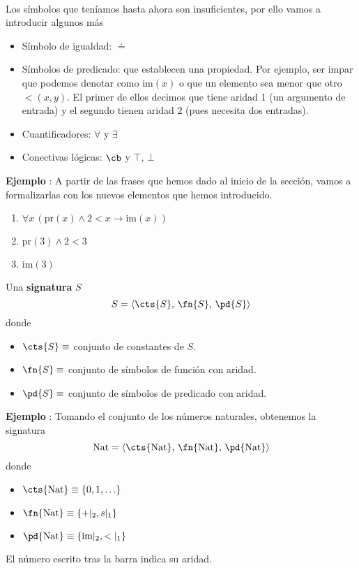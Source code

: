 \paragraph{}
Los símbolos que teníamos hasta ahora son insuficientes, por ello vamos a introducir algunos más
\begin{itemize}
	\item Símbolo de igualdad: $\doteq$
	\item Símbolos de predicado: que establecen una propiedad. Por ejemplo, ser impar que podemos denotar como $\mbox{im}(x)$ o que un elemento sea menor que otro $<(x,y)$. El primer de ellos decimos que tiene aridad 1 (un argumento de entrada) y el segundo tienen aridad 2 (pues necesita dos entradas).
	\item Cuantificadores: $\forall$ y $\exists$ 
	\item Conectivas lógicas: $\cb$ y $\top$, $\bot$
\end{itemize}
\addtocounter{ej}{1} %
\textbf{Ejemplo }: A partir de las frases que hemos dado al inicio de la sección, vamos a formalizarlas con los nuevos elementos que hemos introducido.
\begin{enumerate}
	\item $\forall x \, (\mbox{pr}(x) \wedge 2<x \rightarrow \mbox{im}(x))$
	\item $\mbox{pr}(3) \wedge 2<3$
	\item $\mbox{im}(3)$
\end{enumerate}
\begin{definition}
Una \textbf{signatura} $S$
\[ S= \langle \cts{S}, \, \fn{S}, \, \pd{S} \rangle \]
donde 
\begin{itemize}
	\item $\cts{S} \equiv$ conjunto de constantes de $S$.
	\item $\fn{S} \equiv$ conjunto de símbolos de función con aridad.
	\item $\pd{S} \equiv$ conjunto de símbolos de predicado con aridad.	
\end{itemize}
\end{definition}
\addtocounter{ej}{1} %
\textbf{Ejemplo }: Tomando el conjunto de los números naturales, obtenemos la signatura 
\[ \mbox{Nat}= \langle \cts{\mbox{Nat}}, \, \fn{\mbox{Nat}}, \, \pd{\mbox{Nat}} \rangle \]
donde 
\begin{itemize}
	\item $\cts{\mbox{Nat}} \equiv \{0, 1, \ldots\}$
	\item $\fn{\mbox{Nat}} \equiv \{+\vert_{2}, s\vert_{1}\} $ 
	\item $\pd{\mbox{Nat}} \equiv \{\mbox{im}\vert_{2}, <\vert_{1}\} $ 	
\end{itemize}
El número escrito tras la barra indica su aridad.
